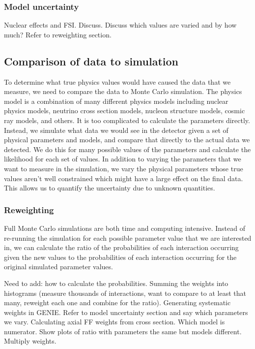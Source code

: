   \subsubsection{Model uncertainty}
    Nuclear effects and FSI. Discuss. Discuss which values are varied and by
    how much? Refer to reweighting section. 

\subsection{Comparison of data to simulation}
  To determine what true physics values would have caused the data that we
  measure, we need to compare the data to Monte Carlo simulation. The physics
  model is a combination of many different physics models including nuclear
  physics models, neutrino cross section models, nucleon structure models,
  cosmic ray models, and others. It is too complicated to calculate the
  parameters directly. Instead, we simulate what data we would see in the
  detector given a set of physical parameters and models, and compare that
  directly to the actual data we detected. We do this for many possible values
  of the parameters and calculate the likelihood for each set of values. In
  addition to varying the parameters that we want to measure in the simulation,
  we vary the physical parameters whose true values aren't well constrained
  which might have a large effect on the final data. This allows us to quantify
  the uncertainty due to unknown quantities.
  \subsubsection{Reweighting}
    Full Monte Carlo simulations are both time and computing intensive. Instead
    of re-running the simulation for each possible parameter value that we are
    interested in, we can calculate the ratio of the probabilities of each
    interaction occurring given the new values to the probabilities of each
    interaction occurring for the original simulated parameter values.

    Need to add: how to calculate the probabilities. Summing the weights into
    histograms (measure thousands of interactions, want to compare to at least
    that many, reweight each one and combine for the ratio). Generating
    systematic weights in GENIE. Refer to model uncertainty section and say
    which parameters we vary. Calculating axial FF weights from cross section.
    Which model is numerator. Show plots of ratio with parameters the same but
    models different.  Multiply weights. 

